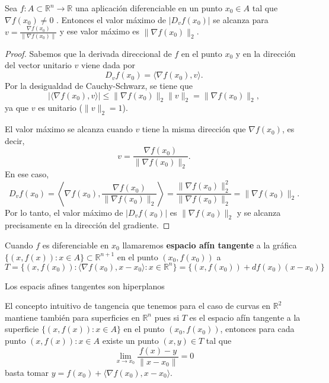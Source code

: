 \begin{corolario}
    Sea $f: A \subset \mathbb{R}^n \to \mathbb{R}$ una aplicación diferenciable en un punto $x_0 \in A$ tal que $\nabla f(x_0) \neq 0$ . Entonces el valor máximo de $|D_vf(x_0)|$ se alcanza para $v = \frac{\nabla f(x_0)}{\|\nabla f(x_0)\|}$ y ese valor máximo es $\|\nabla f(x_0)\|_2$.
\end{corolario}
\begin{proof}
    Sabemos que la derivada direccional de $f$ en el punto $x_0$ y en la dirección del vector unitario $v$ viene dada por
    \[
    D_v f(x_0) = \langle \nabla f(x_0), v \rangle.
    \]
    Por la desigualdad de Cauchy-Schwarz, se tiene que
    \[
    |\langle \nabla f(x_0), v \rangle| \leq \|\nabla f(x_0)\|_2 \|v\|_2 = \|\nabla f(x_0)\|_2,
    \]
    ya que $v$ es unitario ($\|v\|_2 = 1$).

    El valor máximo se alcanza cuando $v$ tiene la misma dirección que $\nabla f(x_0)$, es decir,
    \[
    v = \frac{\nabla f(x_0)}{\|\nabla f(x_0)\|_2}.
    \]
    En ese caso,
    \[
    D_v f(x_0) = \left\langle \nabla f(x_0), \frac{\nabla f(x_0)}{\|\nabla f(x_0)\|_2} \right\rangle
    = \frac{\|\nabla f(x_0)\|_2^2}{\|\nabla f(x_0)\|_2} = \|\nabla f(x_0)\|_2.
    \]
    Por lo tanto, el valor máximo de $|D_v f(x_0)|$ es $\|\nabla f(x_0)\|_2$ y se alcanza precisamente en la dirección del gradiente.
\end{proof}

\begin{definición}
    Cuando $f$ es diferenciable en $x_0$ llamaremos \textbf{espacio afín tangente} a la gráfica $\{(x,f(x)) : x \in A\} \subset \mathbb{R}^{n+1}$ en el punto $(x_0,f(x_0))$ a
    $$ T = \{(x,f(x_0)) : \langle \nabla f(x_0), x - x_0\rangle : x\in \mathbb{R}^n\} = \{(x, f(x_0)) + df(x_0)(x - x_0)\}$$
\end{definición}
\begin{observación}
    Los espacis afines tangentes son hiperplanos
\end{observación}

\begin{observación}
    El concepto intuitivo de tangencia que tenemos para el caso de curvas en $\mathbb{R}^2$ mantiene también para superficies en $\mathbb{R}^n$ pues si $T$ es el espacio afín tangente a la superficie $\{(x,f(x)) : x \in A\}$ en el punto $(x_0,f(x_0))$, entonces para cada punto $(x, f(x)) : x \in A$ existe un punto $(x, y) \in T$ tal que
    $$ \lim_{x \to x_0} \frac{f(x) - y}{\|x - x_0\|} = 0 $$
    basta tomar $y = f(x_0) + \langle \nabla f(x_0), x - x_0\rangle$.
\end{observación}


